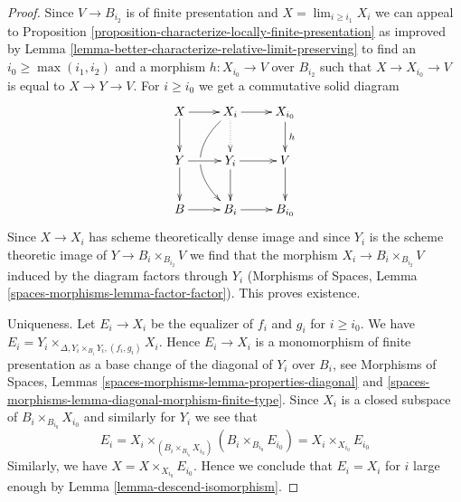 \documentclass{stacks-project}
\theoremstyle{plain}
\theoremstyle{definition}
\theoremstyle{remark}
\numberwithin{equation}{subsection}
\def\lim{\mathop{\mathrm{lim}}\nolimits}
\begin{document}
\begin{proof}
Since $V \to B_{i_2}$ is of finite presentation and
$X = \lim_{i \geq i_1} X_i$ we can appeal to Proposition
\ref{proposition-characterize-locally-finite-presentation}
as improved by Lemma \ref{lemma-better-characterize-relative-limit-preserving}
to find an $i_0 \geq \max(i_1, i_2)$ and a morphism $h : X_{i_0} \to V$
over $B_{i_2}$ such that $X \to X_{i_0} \to V$ is equal to $X \to Y \to V$.
For $i \geq i_0$ we get a commutative solid diagram
$$
\xymatrix{
X \ar[d] \ar[r] &
X_i \ar[r] \ar@{..>}[d] \ar@/_2pc/[dd] |!{[d];[ld]}\hole &
X_{i_0} \ar[d]^h \\
Y \ar[r] \ar[d] & Y_i \ar[r] \ar[d] & V \ar[d] \\
B \ar[r] & B_i \ar[r] & B_{i_0}
}
$$
Since $X \to X_i$ has scheme theoretically dense image
and since $Y_i$ is the scheme theoretic image of
$Y \to B_i \times_{B_{i_2}} V$
we find that the morphism $X_i \to B_i \times_{B_{i_2}} V$
induced by the diagram factors through $Y_i$
(Morphisms of Spaces, Lemma \ref{spaces-morphisms-lemma-factor-factor}).
This proves existence.

\medskip\noindent
Uniqueness. Let $E_i \to X_i$ be the equalizer of $f_i$ and $g_i$
for $i \geq i_0$. We have
$E_i = Y_i \times_{\Delta, Y_i \times_{B_i} Y_i, (f_i, g_i)} X_i$.
Hence $E_i \to X_i$ is a monomorphism of finite presentation as a base
change of the diagonal of $Y_i$ over $B_i$, see
Morphisms of Spaces, Lemmas \ref{spaces-morphisms-lemma-properties-diagonal} and
\ref{spaces-morphisms-lemma-diagonal-morphism-finite-type}.
Since $X_i$ is a closed subspace of $B_i \times_{B_{i_0}} X_{i_0}$
and similarly for $Y_i$ we see that
$$
E_i =
X_i \times_{(B_i \times_{B_{i_0}} X_{i_0})} (B_i \times_{B_{i_0}} E_{i_0}) =
X_i \times_{X_{i_0}} E_{i_0}
$$
Similarly, we have $X = X \times_{X_{i_0}} E_{i_0}$. Hence we conclude
that $E_i = X_i$ for $i$ large enough by Lemma \ref{lemma-descend-isomorphism}.
\end{proof}
\end{document}
